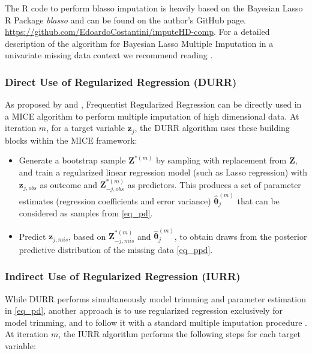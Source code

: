 	The R code to perform blasso imputation is heavily based on the Bayesian Lasso R Package \emph{blasso} 
	\citep{blasso} and can be found on the author's GitHub page.
	\url{https://github.com/EdoardoCostantini/imputeHD-comp}.
	For a detailed description of the algorithm for Bayesian Lasso Multiple Imputation in a univariate
	missing data context we recommend reading \cite{zhaoLong:2016}.

\subsubsection{Direct Use of Regularized Regression (DURR)}
	As proposed by \cite{zhaoLong:2016} and \cite{dengEtAl:2016}, Frequentist Regularized Regression can be 
	directly used in a MICE algorithm to perform multiple imputation of high dimensional data.
	At iteration $m$, for a target variable $\bm{z}_j$, the DURR algorithm uses these building blocks within 
	the MICE framework:

	\begin{itemize}

	\item Generate a bootstrap sample $\bm{Z}^{*(m)}$ by sampling with replacement from $\bm{Z}$,
		and train a regularized linear regression model (such as Lasso regression) with
		$\bm{z}_{j,obs}$ as outcome and $\bm{Z}_{-j,obs}^{*(m)}$ as predictors.
		This produces a set of parameter estimates (regression coefficients and error variance)
		$\hat{\bm{\theta}}_{j}^{(m)}$ that can be considered as samples from \eqref{eq_pd}.

	\item Predict $\bm{z}_{j,mis}$, based on $\bm{Z}_{-j, mis}^{*(m)}$ and $\hat{\bm{\theta}}_{j}^{(m)}$, 
		to obtain draws from the posterior predictive distribution of the missing data \eqref{eq_ppd}.

	\end{itemize}

\subsubsection{Indirect Use of Regularized Regression (IURR)}
	While DURR performs simultaneously model trimming and parameter estimation in \eqref{eq_pd}, another 
	approach is to use regularized regression exclusively for model trimming, and to follow it with a 
	standard multiple imputation procedure \citep{zhaoLong:2016, dengEtAl:2016}. 
	At iteration $m$, the IURR algorithm performs the following steps for each
	target variable:

